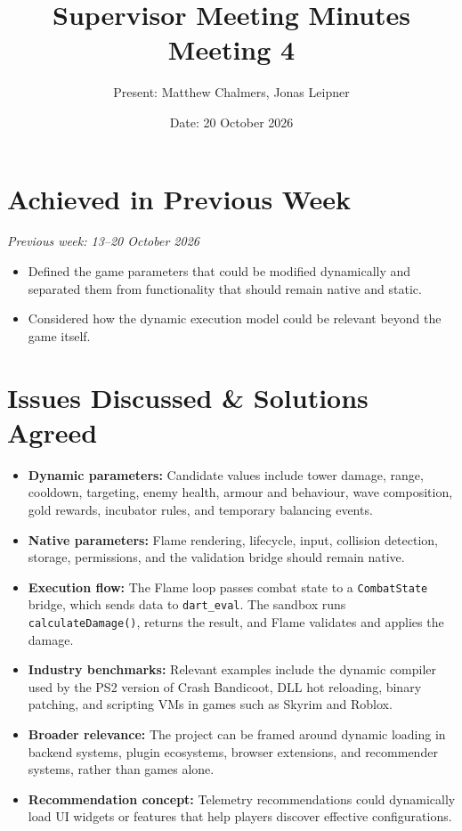 \documentclass[12pt,a4paper]{article}
\title{\textbf{Supervisor Meeting Minutes}\\Meeting 4}
\author{Present: Matthew Chalmers, Jonas Leipner}
\date{Date: 20 October 2026}
\begin{document}
\maketitle

\section{Achieved in Previous Week}

\noindent\textit{Previous week: 13--20 October 2026}
\begin{itemize}[leftmargin=*]
    \item Defined the game parameters that could be modified dynamically and separated them from functionality that should remain native and static.
    \item Considered how the dynamic execution model could be relevant beyond the game itself.
\end{itemize}

\section{Issues Discussed \& Solutions Agreed}

\begin{itemize}[leftmargin=*]
    \item \textbf{Dynamic parameters:} Candidate values include tower damage, range, cooldown, targeting, enemy health, armour and behaviour, wave composition, gold rewards, incubator rules, and temporary balancing events.
    \item \textbf{Native parameters:} Flame rendering, lifecycle, input, collision detection, storage, permissions, and the validation bridge should remain native.
    \item \textbf{Execution flow:} The Flame loop passes combat state to a \texttt{CombatState} bridge, which sends data to \texttt{dart\_eval}. The sandbox runs \texttt{calculateDamage()}, returns the result, and Flame validates and applies the damage.
    \item \textbf{Industry benchmarks:} Relevant examples include the dynamic compiler used by the PS2 version of Crash Bandicoot, DLL hot reloading, binary patching, and scripting VMs in games such as Skyrim and Roblox.
    \item \textbf{Broader relevance:} The project can be framed around dynamic loading in backend systems, plugin ecosystems, browser extensions, and recommender systems, rather than games alone.
    \item \textbf{Recommendation concept:} Telemetry recommendations could dynamically load UI widgets or features that help players discover effective configurations.
\end{itemize}
\end{document}
